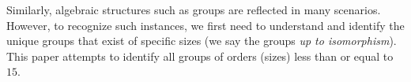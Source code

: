 Similarly, algebraic structures such as groups are reflected in many scenarios.
However, to recognize such instances, we first need to understand
and identify the unique groups that exist of specific sizes
(we say the groups \emph{up to isomorphism}).
This paper attempts to identify all groups of orders (sizes) less than or equal to $15$.

